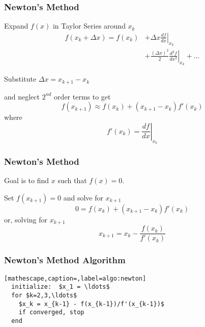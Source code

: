 \documentclass[10pt]{beamer}
\begin{document}
\begin{frame}
\frametitle{Newton's Method}


Expand $f(x)$ in Taylor Series around $x_k$
\begin{align*}
    f(x_k + \Delta x) = f(x_k) &+ \Delta x \left. \frac{df}{dx}\right|_{x_k}  \\[4pt]
                               &+ \frac{(\Delta x)^2}{2} \left. \frac{d^2 f}{dx^2}\right|_{x_k}
                                + \ldots
\end{align*}

Substitute $\Delta x = x_{k+1} - x_k$

and neglect $2^{nd}$ order terms to get
\begin{equation*}
	f(x_{k+1}) \approx f(x_k) + \left( x_{k+1} - x_k \right) f'(x_k)
\end{equation*}
where
\begin{equation*}
    f'(x_k) = \left. \frac{df}{dx} \right|_{x_k}
\end{equation*}




\end{frame}
\begin{frame}
\frametitle{Newton's Method}


Goal is to find $x$ such that $f(x) = 0$.

Set $f(x_{k+1}) = 0$ and solve for $x_{k+1}$
\begin{equation*}
    0 = f(x_k) + \left( x_{k+1} - x_k \right) f'(x_k)
\end{equation*}
or, solving for $x_{k+1}$
\begin{equation*}
    \boxed{
        x_{k+1} = x_k - \frac{f(x_k)}{f'(x_k)}
    }
\end{equation*}



\end{frame}
\begin{frame}[fragile]
\frametitle{Newton's Method Algorithm}

\begin{lstlisting}[mathescape,caption=,label=algo:newton]
  initialize:  $x_1 = \ldots$                      
  for $k=2,3,\ldots$                               
    $x_k = x_{k-1} - f(x_{k-1})/f'(x_{k-1})$       
    if converged, stop       
  end
\end{lstlisting}



\end{frame}
\end{document}
